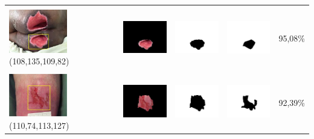 \begin{table}[H]
\begin{tabular}{|m{1.0in}|m{1.0in}|m{1.0in}|m{1.0in}|m{0.6in}|}
		&  &  & \\
		\includegraphics[width=1.0in]{gambar/hasil_segmentasi/luka_merah/image_36_rect.jpg} {\centering\fontsize{10}{10}\selectfont(108,135,109,82)}&
		\includegraphics[width=1.0in]{gambar/hasil_segmentasi/luka_merah/result_36.jpg}&
		\includegraphics[width=1.0in]{gambar/hasil_segmentasi/luka_merah/mask_r_36.jpg}&
		\includegraphics[width=1.0in]{gambar/hasil_segmentasi/luka_merah/36_r.jpg}&
		95,08\% \\
		\hline

		&  &  & \\
		\includegraphics[width=1.0in]{gambar/hasil_segmentasi/luka_merah/image_38_rect.jpg} {\centering\fontsize{10}{10}\selectfont(110,74,113,127)}&
		\includegraphics[width=1.0in]{gambar/hasil_segmentasi/luka_merah/result_38.jpg}&
		\includegraphics[width=1.0in]{gambar/hasil_segmentasi/luka_merah/mask_r_38.jpg}&
		\includegraphics[width=1.0in]{gambar/hasil_segmentasi/luka_merah/38_r.jpg}&
		92,39\% \\
		\hline
	\end{tabular}
\end{table}

